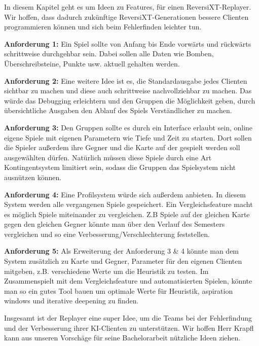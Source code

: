 \documentclass[12pt,a4paper,bibliography=totocnumbered,listof=totocnumbered]{scrartcl}
\begin{document}
	In diesem Kapitel geht es um Ideen zu Features, für einen ReversiXT-Replayer. Wir hoffen, dass dadurch zukünftige ReversiXT-Generationen bessere Clienten programmieren können und sich beim Fehlerfinden leichter tun.
	
	\textbf{Anforderung 1:} Ein Spiel sollte von Anfang bis Ende vorwärts und rückwärts schrittweise durchgehbar sein. Dabei sollen alle Daten wie Bomben, Überschreibsteine, Punkte usw. aktuell gehalten werden.
	
	\textbf{Anforderung 2:} Eine weitere Idee ist es, die Standardausgabe jedes Clienten sichtbar zu machen und diese auch schrittweise nachvollziehbar zu machen. Das würde das Debugging erleichtern und den Gruppen die Möglichkeit geben, durch übersichtliche Ausgaben den Ablauf des Spiels Verständlicher zu machen.
	
	\textbf{Anforderung 3:} Den Gruppen sollte es durch ein Interface erlaubt sein, online eigene Spiele mit eigenen Parametern wie Tiefe und Zeit zu starten. Dort sollen die Spieler außerdem ihre Gegner und die Karte auf der gespielt werden soll ausgewählten dürfen. Natürlich müssen diese Spiele durch eine Art Kontingentsystem limitiert sein, sodass die Gruppen das Spielsystem nicht ausnützen können. 
	
	\textbf{Anforderung 4:} Eine Profilsystem würde sich außerdem anbieten. In diesem System werden alle vergangenen Spiele gespeichert. Ein Vergleichsfeature macht es möglich Spiele miteinander zu vergleichen. Z.B Spiele auf der gleichen Karte gegen den gleichen Gegner könnte man über den Verlauf des Semesters vergleichen und so eine Verbesserung/Verschlechterung feststellen.
	
	\textbf{Anforderung 5:} Als Erweiterung der Anforderung 3 \& 4 könnte man dem System zusätzlich zu Karte und Gegner, Parameter für den eigenen Clienten mitgeben, z.B. verschiedene Werte um die Heuristik zu testen. Im Zusammenspielt mit dem Vergleichsfeature und automatisierten Spielen, könnte man so ein gutes Tool bauen um optimale Werte für Heuristik, aspiration windows und iterative deepening zu finden.
	
	Insgesamt ist der Replayer eine super Idee, um die Teams bei der Fehlerfindung und der Verbesserung ihrer KI-Clienten zu unterstützen. Wir hoffen Herr Krapfl kann aus unseren Vorschäge für seine Bachelorarbeit nützliche Ideen ziehen.
	
    \newpage
\end{document}
